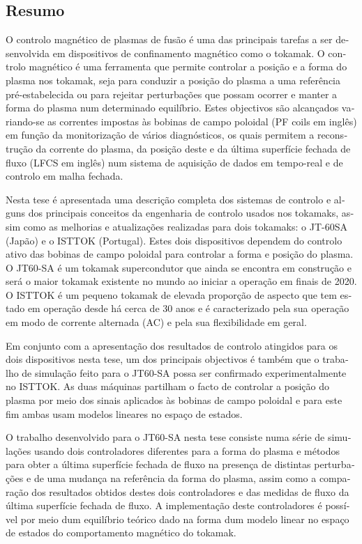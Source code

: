 \pagebreak
\begin{otherlanguage}{portuguese}
\chapter*{Resumo}

O  controlo magnético de plasmas de fusão é uma das principais tarefas a ser desenvolvida em dispositivos de confinamento magnético como o tokamak. O controlo magnético é uma ferramenta que permite controlar a posição e a forma do plasma nos tokamak, seja para conduzir a posição do plasma a uma referência pré-estabelecida ou para rejeitar perturbações que possam ocorrer e manter a forma do plasma num determinado equilíbrio. Estes objectivos são alcançados variando-se as correntes impostas às bobinas de campo poloidal (PF coils em inglês)  em função da monitorização de vários diagnósticos, os quais permitem a reconstrução da corrente do plasma, da posição deste e da última superfície fechada de fluxo (LFCS em inglês) num sistema de aquisição de dados em tempo-real e de controlo em malha fechada. \smallskip

Nesta tese é apresentada uma descrição completa dos sistemas de controlo e alguns dos principais conceitos da engenharia de controlo usados nos tokamaks, assim como as melhorias e atualizações realizadas para dois tokamaks: o JT-60SA (Japão) e o ISTTOK (Portugal). Estes dois dispositivos dependem do controlo ativo das bobinas de campo poloidal para controlar a forma e posição do plasma. O JT60-SA é um tokamak supercondutor que ainda se encontra em construção e será o maior tokamak existente no mundo ao iniciar a operação em finais de 2020. O ISTTOK é um pequeno tokamak de elevada proporção de aspecto que tem estado em operação desde há cerca de 30 anos e é caracterizado pela sua operação em modo de corrente alternada (AC) e pela sua flexibilidade em geral.\smallskip

Em conjunto com a apresentação dos resultados de controlo atingidos para os dois dispositivos nesta tese, um dos principais objectivos é também que o trabalho de simulação feito para o JT60-SA possa ser confirmado experimentalmente no ISTTOK. As duas máquinas partilham o facto de controlar a posição do plasma por meio dos sinais aplicados às bobinas de campo poloidal e para este fim ambas usam modelos lineares no espaço de estados.  \smallskip

O trabalho desenvolvido para o JT60-SA nesta tese consiste numa série de simulações usando dois controladores diferentes para a forma do plasma e métodos para obter a última superfície fechada de fluxo na presença de distintas perturbações e de uma mudança na referência da forma do plasma, assim como a comparação dos resultados obtidos destes dois controladores e  das medidas de fluxo da última superfície fechada de fluxo. A implementação deste controladores é  possível por meio dum equilíbrio teórico dado na forma dum modelo linear no espaço de estados do comportamento magnético do tokamak.\smallskip


\end{otherlanguage}

